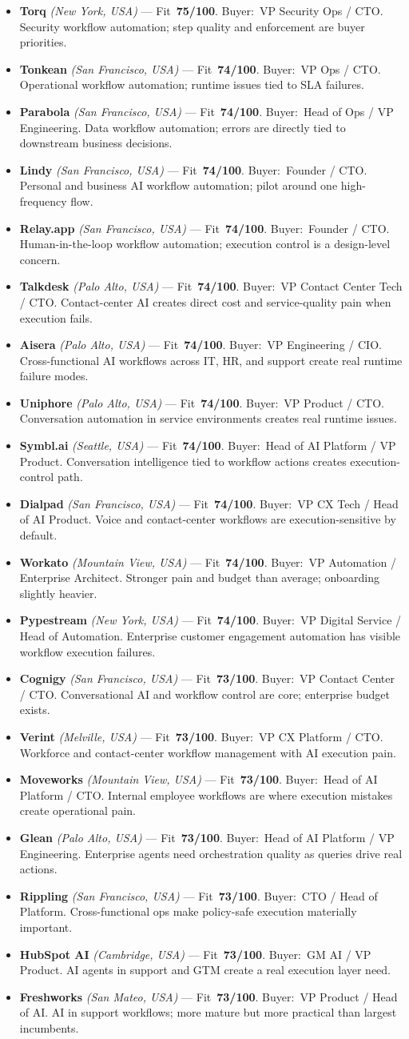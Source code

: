 \documentclass[10pt]{article}
\newcommand{\cand}[5]{\item \textbf{#1} \textit{(#2)} --- Fit~\textbf{#3/100}. Buyer:~#4. #5}
\begin{document}
\begin{itemize}
\cand{Torq}{New York, USA}{75}{VP Security Ops / CTO}{Security workflow automation; step quality and enforcement are buyer priorities.}
\cand{Tonkean}{San Francisco, USA}{74}{VP Ops / CTO}{Operational workflow automation; runtime issues tied to SLA failures.}
\cand{Parabola}{San Francisco, USA}{74}{Head of Ops / VP Engineering}{Data workflow automation; errors are directly tied to downstream business decisions.}
\cand{Lindy}{San Francisco, USA}{74}{Founder / CTO}{Personal and business AI workflow automation; pilot around one high-frequency flow.}
\cand{Relay.app}{San Francisco, USA}{74}{Founder / CTO}{Human-in-the-loop workflow automation; execution control is a design-level concern.}
\cand{Talkdesk}{Palo Alto, USA}{74}{VP Contact Center Tech / CTO}{Contact-center AI creates direct cost and service-quality pain when execution fails.}
\cand{Aisera}{Palo Alto, USA}{74}{VP Engineering / CIO}{Cross-functional AI workflows across IT, HR, and support create real runtime failure modes.}
\cand{Uniphore}{Palo Alto, USA}{74}{VP Product / CTO}{Conversation automation in service environments creates real runtime issues.}
\cand{Symbl.ai}{Seattle, USA}{74}{Head of AI Platform / VP Product}{Conversation intelligence tied to workflow actions creates execution-control path.}
\cand{Dialpad}{San Francisco, USA}{74}{VP CX Tech / Head of AI Product}{Voice and contact-center workflows are execution-sensitive by default.}
\cand{Workato}{Mountain View, USA}{74}{VP Automation / Enterprise Architect}{Stronger pain and budget than average; onboarding slightly heavier.}
\cand{Pypestream}{New York, USA}{74}{VP Digital Service / Head of Automation}{Enterprise customer engagement automation has visible workflow execution failures.}
\cand{Cognigy}{San Francisco, USA}{73}{VP Contact Center / CTO}{Conversational AI and workflow control are core; enterprise budget exists.}
\cand{Verint}{Melville, USA}{73}{VP CX Platform / CTO}{Workforce and contact-center workflow management with AI execution pain.}
\cand{Moveworks}{Mountain View, USA}{73}{Head of AI Platform / CTO}{Internal employee workflows are where execution mistakes create operational pain.}
\cand{Glean}{Palo Alto, USA}{73}{Head of AI Platform / VP Engineering}{Enterprise agents need orchestration quality as queries drive real actions.}
\cand{Rippling}{San Francisco, USA}{73}{CTO / Head of Platform}{Cross-functional ops make policy-safe execution materially important.}
\cand{HubSpot AI}{Cambridge, USA}{73}{GM AI / VP Product}{AI agents in support and GTM create a real execution layer need.}
\cand{Freshworks}{San Mateo, USA}{73}{VP Product / Head of AI}{AI in support workflows; more mature but more practical than largest incumbents.}

\end{itemize}
\end{document}
